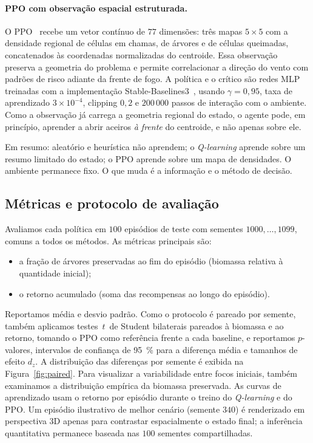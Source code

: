 \documentclass[11pt,a4paper]{article}
\begin{document}
\paragraph{PPO com observação espacial estruturada.}
O PPO~\cite{schulman2017} recebe um vetor contínuo de $77$ dimensões:
três mapas $5\times 5$ com a densidade regional de células em chamas, de
árvores e de células queimadas, concatenados às coordenadas normalizadas do
centroide.
Essa observação preserva a geometria do problema e permite correlacionar a
direção do vento com padrões de risco adiante da frente de fogo.
A política e o crítico são redes MLP treinadas com a implementação
Stable-Baselines3~\cite{raffin2021}, usando $\gamma=0{,}95$, taxa de
aprendizado $3\times 10^{-4}$, clipping $0{,}2$ e $200\,000$ passos de
interação com o ambiente.
Como a observação já carrega a geometria regional do estado, o agente pode, em
princípio, aprender a abrir aceiros \emph{à frente} do centroide, e não
apenas sobre ele.

Em resumo: aleatório e heurística não aprendem; o \emph{Q-learning} aprende
sobre um resumo limitado do estado; o PPO aprende sobre um mapa de densidades.
O ambiente permanece fixo. O que muda é a informação e o método de decisão.

\subsection{Métricas e protocolo de avaliação}
\label{sec:avaliacao}

Avaliamos cada política em $100$ episódios de teste com sementes
$1000,\ldots,1099$, comuns a todos os métodos.
As métricas principais são:
\begin{itemize}
  \item a fração de árvores preservadas ao fim do episódio (biomassa relativa
        à quantidade inicial);
  \item o retorno acumulado (soma das recompensas ao longo do episódio).
\end{itemize}
Reportamos média e desvio padrão.
Como o protocolo é pareado por semente, também aplicamos testes~$t$~de Student
bilaterais pareados à biomassa e ao retorno, tomando o PPO como referência
frente a cada baseline, e reportamos $p$-valores, intervalos de confiança
de \SI{95}{\percent} para a diferença média e tamanhos de efeito $d_z$.
A distribuição das diferenças por semente é exibida na Figura~\ref{fig:paired}.
Para visualizar a variabilidade entre focos iniciais, também examinamos a
distribuição empírica da biomassa preservada.
As curvas de aprendizado usam o retorno por episódio durante o treino do
\emph{Q-learning} e do PPO.
Um episódio ilustrativo de melhor cenário (semente $340$) é renderizado em
perspectiva 3D apenas para contrastar espacialmente o estado final; a
inferência quantitativa permanece baseada nas $100$ sementes compartilhadas.
\end{document}
